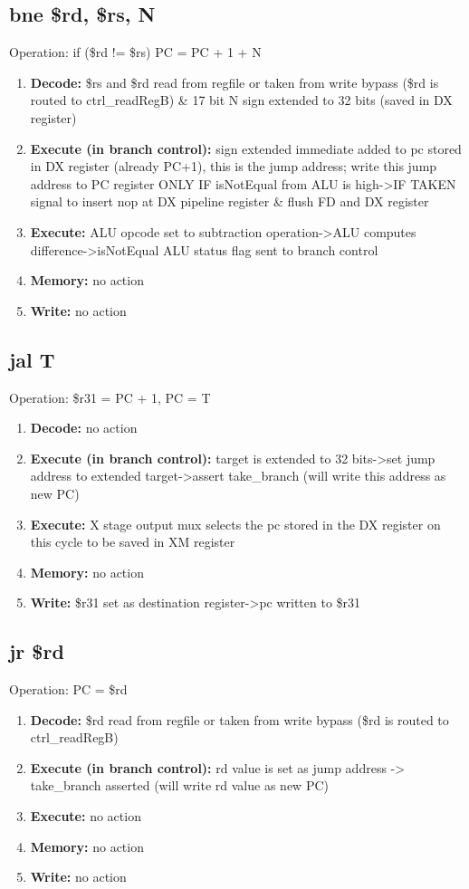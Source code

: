\documentclass[letterpaper]{article}
\begin{document}
\subsection{bne \$rd, \$rs, N }
Operation: if (\$rd != \$rs) PC = PC + 1 + N
\begin{enumerate}
    \item \textbf{Decode:} \$rs and \$rd read from regfile or taken from write bypass (\$rd is routed to ctrl\_readRegB) \& 17 bit N sign extended to 32 bits (saved in DX register)
    \item \textbf{Execute (in branch control):} sign extended immediate added to pc stored in DX register (already PC+1), this is the jump address; write this jump address to PC register ONLY IF isNotEqual from ALU is high->IF TAKEN signal to insert nop at DX pipeline register \& flush FD and DX register
    \item \textbf{Execute:} ALU opcode set to subtraction operation->ALU computes difference->isNotEqual ALU status flag sent to branch control
    \item \textbf{Memory:} no action
    \item \textbf{Write:} no action
\end{enumerate}

\subsection{jal T}
Operation: \$r31 = PC + 1, PC = T
\begin{enumerate}
    \item \textbf{Decode:} no action
    \item \textbf{Execute (in branch control):} target is extended to 32 bits->set jump address to extended target->assert take\_branch (will write this address as new PC)
    \item \textbf{Execute:} X stage output mux selects the pc stored in the DX register on this cycle to be saved in XM register
    \item \textbf{Memory:} no action
    \item \textbf{Write:} \$r31 set as destination register->pc written to \$r31
\end{enumerate}

\subsection{jr \$rd}
Operation: PC = \$rd
\begin{enumerate}
    \item \textbf{Decode:} \$rd read from regfile or taken from write bypass (\$rd is routed to ctrl\_readRegB)
    \item \textbf{Execute (in branch control):} rd value is set as jump address -> take\_branch asserted (will write rd value as new PC)
    \item \textbf{Execute:} no action
    \item \textbf{Memory:} no action
    \item \textbf{Write:} no action
\end{enumerate}
\end{document}
